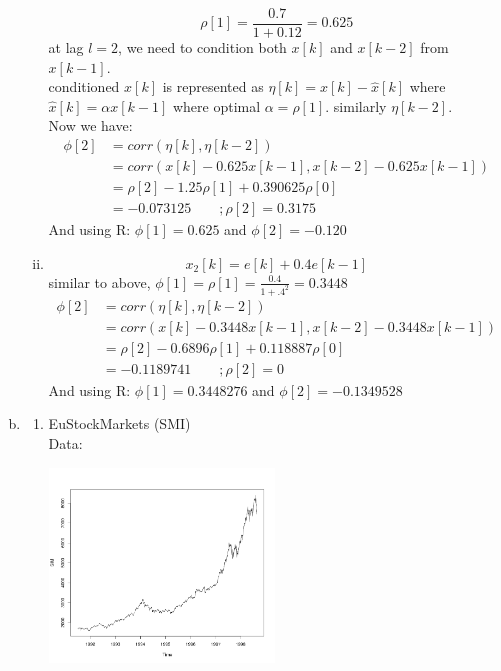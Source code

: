 \documentclass[11pt,paper=a4,answers]{exam}
\begin{document}
\begin{questions}
\begin{enumerate}[(a)]
\begin{enumerate}[(i)]
        $$\rho [1]  =\frac{0.7}{1+0.12} = 0.625$$
        at lag $l=2$, we need to condition both $x[k]$ and $x[k-2]$ from $x[k-1]$.\\
        conditioned $x[k]$ is represented as $\eta [k] = x[k] - \hat{x} [k]$ where $\hat{x} [k] = \alpha x[k-1]$ where optimal $\alpha = \rho[1]$. similarly $\eta [k-2]$.\\
        Now we have:
        \begin{align}
            \phi [2] &= corr(\eta [k], \eta [k-2]) \nonumber \\
            &= corr(x[k] - 0.625 x[k-1], x[k-2] - 0.625 x[k-1]) \nonumber \\
            &= \rho[2] - 1.25 \rho[1] + 0.390625 \rho[0] \nonumber \\
            &= -0.073125 \qquad ; \rho[2] = 0.3175 \nonumber
        \end{align}
        And using R: $\phi [1] = 0.625$  and $\phi [2] = -0.120$\\
        \item
        $$x_2 [k] = e[k] + 0.4e[k-1]$$
        similar to above, $\phi[1] = \rho[1] = \frac{0.4}{1+.4^2} = 0.3448$\\
        \begin{align}
            \phi[2] &= corr(\eta [k], \eta [k-2]) \nonumber \\
            &= corr(x[k] - 0.3448 x[k-1], x[k-2] - 0.3448 x[k-1])\\
            &= \rho[2] - 0.6896\rho[1] + 0.118887 \rho[0] \nonumber \\
            &= -0.1189741 \qquad ; \rho[2] = 0 \nonumber
        \end{align}
        And using R: $\phi [1] = 0.3448276$  and $\phi [2] = -0.1349528$\\
    \end{enumerate}
    \item \begin{enumerate}
        \item EuStockMarkets (SMI)\\
        Data:\\
        \centerline{\includegraphics[width=6cm]{sim.png}}

\end{enumerate}
\end{enumerate}
\end{questions}
\end{document}
